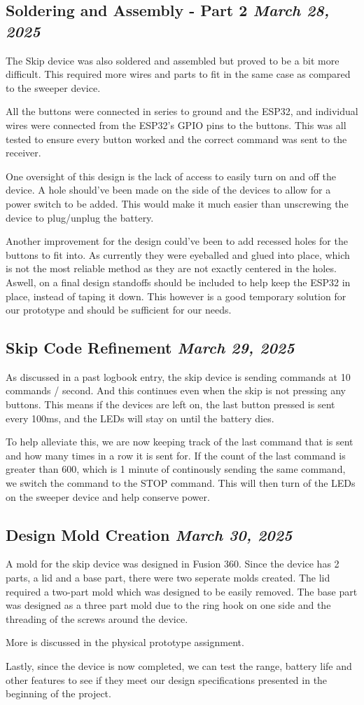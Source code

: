 \documentclass{article}
\newcommand{\logbookentry}[2]{
    \subsection*{#1 \hfill \textit{#2}} 
}
\begin{document}
\logbookentry{Soldering and Assembly - Part 2}{March 28, 2025}
The Skip device was also soldered and assembled but proved to be a bit more difficult. This required more wires and parts to fit in the same case as compared to the sweeper device.

All the buttons were connected in series to ground and the ESP32, and individual wires were connected from the ESP32's GPIO pins to the buttons. This was all tested to ensure every button worked and the correct command was sent to the receiver. 

One oversight of this design is the lack of access to easily turn on and off the device. A hole should've been made on the side of the devices to allow for a power switch to be added. This would make it much easier than unscrewing the device to plug/unplug the battery.

Another improvement for the design could've been to add recessed holes for the buttons to fit into. As currently they were eyeballed and glued into place, which is not the most reliable method as they are not exactly centered in the holes. Aswell, on a final design standoffs should be included to help keep the ESP32 in place, instead of taping it down. This however is a good temporary solution for our prototype and should be sufficient for our needs.

\logbookentry{Skip Code Refinement}{March 29, 2025}
As discussed in a past logbook entry, the skip device is sending commands at 10 commands / second. And this continues even when the skip is not pressing any buttons. This means if the devices are left on, the last button pressed is sent every 100ms, and the LEDs will stay on until the battery dies.

To help alleviate this, we are now keeping track of the last command that is sent and how many times in a row it is sent for. If the count of the last command is greater than 600, which is 1 minute of continously sending the same command, we switch the command to the STOP command. This will then turn of the LEDs on the sweeper device and help conserve power.

\logbookentry{Design Mold Creation}{March 30, 2025}
A mold for the skip device was designed in Fusion 360. Since the device has 2 parts, a lid and a base part, there were two seperate molds created. The lid required a two-part mold which was designed to be easily removed. The base part was designed as a three part mold due to the ring hook on one side and the threading of the screws around the device. 

More is discussed in the physical prototype assignment.

Lastly, since the device is now completed, we can test the range, battery life and other features to see if they meet our design specifications presented in the beginning of the project.


\end{document}
